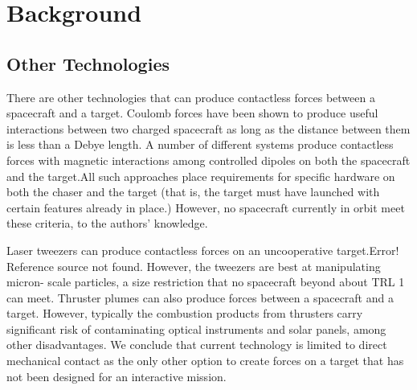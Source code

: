 \documentclass{article}
\begin{document}
\section{Background}
\subsection{Other Technologies}

There are other technologies that can produce
contactless forces between a spacecraft and a target.
Coulomb forces have been shown to produce useful
interactions between two charged spacecraft as long as
the distance between them is less than a Debye length. 
A number of different systems produce contactless
forces with magnetic interactions among controlled
dipoles on both the spacecraft and the target.All such approaches place requirements for specific hardware on both the chaser and the target (that is, the target must have launched with certain features already in place.) However, no spacecraft currently in orbit meet these criteria, to the
authors’ ‎knowledge.

Laser tweezers can produce contactless forces on an
uncooperative target.Error! Reference source not found.
However, the tweezers are best at manipulating micron- scale particles, a size restriction that no spacecraft beyond about TRL 1‎ can meet. Thruster plumes can also produce forces between a spacecraft and a target. However, typically the combustion products from thrusters carry significant risk of contaminating optical instruments and solar panels, among other disadvantages. We conclude that current technology is limited to direct mechanical contact as the only other option to create forces on a target that has not been designed for an interactive mission.


\end{document}
